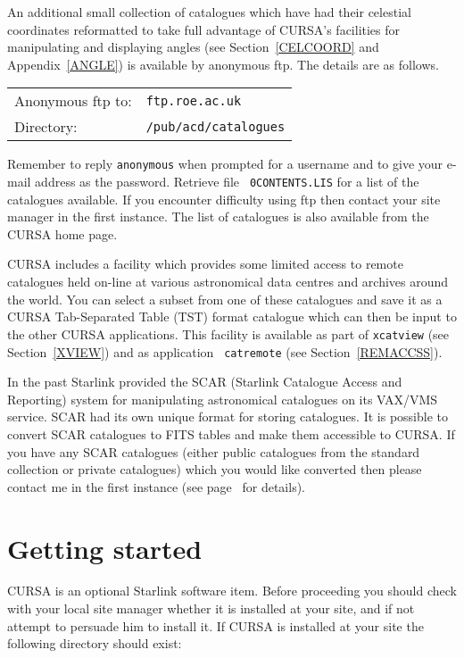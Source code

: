 \documentclass[twoside,11pt]{article}
\newcommand{\xlabel}[1]{}
\renewcommand{\_}{\texttt{\symbol{95}}}
\begin{document}
An additional small collection of catalogues which have had their celestial
coordinates reformatted to take full advantage of CURSA's facilities
for manipulating and displaying angles (see Section~\ref{CELCOORD} and
Appendix~\ref{ANGLE}) is available by anonymous ftp.  The details are
as follows.

\begin{tabular}{ll}
Anonymous ftp to: & {\tt ftp.roe.ac.uk}        \\
Directory:        & {\tt /pub/acd/catalogues}  \\
\end{tabular}

Remember to reply {\tt anonymous} when prompted for a username and
to give your e-mail address as the password.  Retrieve file {\tt
0CONTENTS.LIS} for a list of the catalogues available.  If you encounter
difficulty using ftp then contact your site manager in the first
instance.  The list of catalogues is also available from the CURSA home
page.

CURSA includes a facility which provides some limited access to remote
catalogues held on-line at various astronomical data centres and archives
around the world.  You can select a subset from one of these catalogues and
save it as a CURSA Tab-Separated Table (TST) format catalogue which can
then be input to the other CURSA applications. This facility is available
as part of {\tt xcatview} (see Section~\ref{XVIEW}) and as application {\tt
catremote} (see Section~\ref{REMACCSS}).

In the past Starlink provided the SCAR (Starlink Catalogue Access and
Reporting) system for manipulating astronomical catalogues on its
VAX/VMS service. SCAR had its own unique format for storing catalogues.
It is possible to convert SCAR catalogues to FITS tables and make them
accessible to CURSA. If you have any SCAR catalogues (either public
catalogues from the standard collection or private catalogues) which you
would like converted then please contact me in the first instance (see
page~\pageref{HOMEPAGE} for details).


\section{\xlabel{START}Getting started}

CURSA is an optional Starlink software item. Before proceeding you should
check with your local site manager whether it is installed at your site,
and if not attempt to persuade him to install it.  If CURSA is installed at
your site the following directory should exist:
\end{document}
